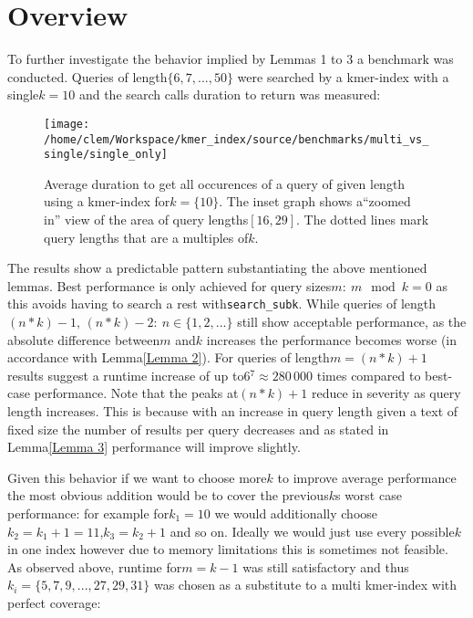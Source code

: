 \section{\label{subsec: multi k overview}Overview}

To further investigate the behavior implied by Lemmas 1 to 3 a benchmark
was conducted. Queries of length$\{6,7,...,50\}$ were searched by
a kmer-index with a single$k=10$ and the search calls duration to
return was measured:

\begin{figure}[H]
\texttt{[image: /home/clem/Workspace/kmer\_index/source/benchmarks/multi\_vs\_single/single\_only]}

\caption{\label{figure 1}Average duration to get all occurences of a query
of given length using a kmer-index for$k=\{10\}$. The inset graph
shows a``zoomed in'' view of the area of query lengths$[16,29]$.
The dotted lines mark query lengths that are a multiples of$k$.}

\end{figure}

The results show a predictable pattern substantiating the above mentioned
lemmas. Best performance is only achieved for query sizes$m:\:m\mod k=0$
as this avoids having to search a rest with\lstinline{search_subk}.
While queries of length$(n*k)-1,\,(n*k)-2:\:n\in\{1,2,...\}$ still
show acceptable performance, as the absolute difference between$m$
and$k$ increases the performance becomes worse (in accordance with
Lemma\ref{Lemma 2}). For queries of length$m=(n*k)+1$ results suggest
a runtime increase of up to$6{{}^7}\approx280\,000$ times compared
to best-case performance. Note that the peaks at$(n*k)+1$ reduce
in severity as query length increases. This is because with an increase
in query length given a text of fixed size the number of results per
query decreases and as stated in Lemma\ref{Lemma 3} performance will
improve slightly.

Given this behavior if we want to choose more$k$ to improve average
performance the most obvious addition would be to cover the previous$k$s
worst case performance: for example for$k_{1}=10$ we would additionally
choose$k_{2}=k_{1}+1=11$,$k_{3}=k_{2}+1$ and so on. Ideally we would
just use every possible$k$ in one index however due to memory limitations
this is sometimes not feasible. As observed above, runtime for$m=k-1$
was still satisfactory and thus$k_{i}=\{5,7,9,...,27,29,31\}$ was
chosen as a substitute to a multi kmer-index with perfect coverage:

